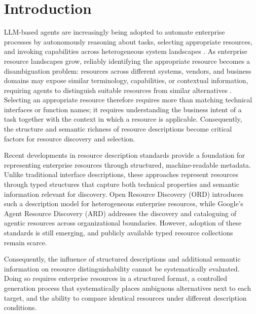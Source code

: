 \documentclass[10pt,twocolumn]{article}
\begin{document}
\section{Introduction}
\label{sec:introduction}

LLM-based agents are increasingly being adopted to automate enterprise processes by autonomously reasoning about tasks, selecting appropriate resources, and invoking capabilities across heterogeneous system landscapes \citep{xu_llm-based_2025,dumas_agentic_2026}. As enterprise resource landscapes grow, reliably identifying the appropriate resource becomes a disambiguation problem: resources across different systems, vendors, and business domains may expose similar terminology, capabilities, or contextual information, requiring agents to distinguish suitable resources from similar alternatives \citep{tang_multi-field_2026}. Selecting an appropriate resource therefore requires more than matching technical interfaces or function names; it requires understanding the business intent of a task together with the context in which a resource is applicable. Consequently, the structure and semantic richness of resource descriptions become critical factors for resource discovery and selection.

Recent developments in resource description standards provide a foundation for representing enterprise resources through structured, machine-readable metadata. Unlike traditional interface descriptions, these approaches represent resources through typed structures that capture both technical properties and semantic information relevant for discovery. Open Resource Discovery (ORD) \citep{linux_foundation_europe_open_nodate} introduces such a description model for heterogeneous enterprise resources, while Google's Agent Resource Discovery (ARD) \citep{bu_announcing_nodate} addresses the discovery and cataloguing of agentic resources across organizational boundaries. However, adoption of these standards is still emerging, and publicly available typed resource collections remain scarce. 

Consequently, the influence of structured descriptions and additional semantic information on resource distinguishability cannot be systematically evaluated. Doing so requires enterprise resources in a structured format, a controlled generation process that systematically places ambiguous alternatives next to each target, and the ability to compare identical resources under different description conditions.
\end{document}
